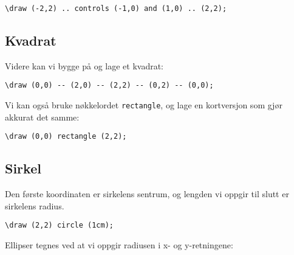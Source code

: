 \documentclass[11pt, a4paper]{article}
\begin{document}
\begin{center}
\end{center}

\begin{Verbatim}[fontsize=\small]
\draw (-2,2) .. controls (-1,0) and (1,0) .. (2,2);
\end{Verbatim}

\newpage

\subsection{Kvadrat}
\noindent Videre kan vi bygge på og lage et kvadrat:
\begin{center}
\end{center}

\begin{Verbatim}[fontsize=\small]
\draw (0,0) -- (2,0) -- (2,2) -- (0,2) -- (0,0);
\end{Verbatim}

Vi kan også bruke nøkkelordet \texttt{rectangle}, og lage en kortversjon som gjør akkurat det samme:
\begin{Verbatim}[fontsize=\small]
\draw (0,0) rectangle (2,2);
\end{Verbatim}

\subsection{Sirkel}
\begin{center}
\end{center}

Den første koordinaten er sirkelens sentrum, og lengden vi oppgir til slutt er sirkelens radius.
\begin{Verbatim}[fontsize=\small]
\draw (2,2) circle (1cm);
\end{Verbatim}

\noindent Ellipser tegnes ved at vi oppgir radiusen i x- og y-retningene:
\begin{center}
\end{center}
\end{document}
